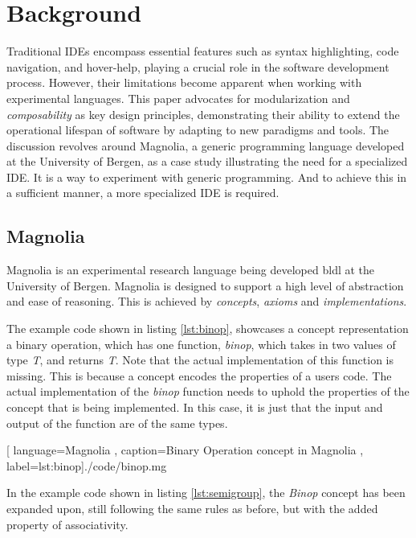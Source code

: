 \chapter{Background}

Traditional IDEs encompass essential features such as syntax highlighting, code
navigation, and hover-help, playing a crucial role in the software development
process. However, their limitations become apparent when working with
experimental languages. This paper advocates for modularization and
\textit{composability} as key design principles, demonstrating their ability to
extend the operational lifespan of software by adapting to new paradigms and
tools. The discussion revolves around Magnolia, a generic programming language
developed at the University of Bergen, as a case study illustrating the need for
a specialized IDE. It is a way to experiment with generic programming. And to
achieve this in a sufficient manner, a more specialized IDE is required.

\section{Magnolia}

Magnolia is an experimental research language being developed \gls{bldl} at the
University of Bergen. Magnolia is designed to support a high level of abstraction
and ease of reasoning. This is achieved by \textit{concepts}, \textit{axioms} and
\textit{implementations}.

The example code shown in listing \ref{lst:binop}, showcases a concept
representation a binary operation, which has one function, \textit{binop}, which
takes in two values of type \textit{T}, and returns \textit{T}. Note that the
actual implementation of this function is missing. This is because a concept
encodes the properties of a users code. The actual implementation of the
\textit{binop} function needs to uphold the properties of the concept that is
being implemented. In this case, it is just that the input and output
of the function are of the same types.

\begin{center}
  
    [ language=Magnolia
    , caption={Binary Operation concept in Magnolia}
    , label=lst:binop]{./code/binop.mg}
\end{center}

In the example code shown in listing \ref{lst:semigroup}, the \textit{Binop}
concept has been expanded upon, still following the same rules as before, but
with the added property of associativity.

